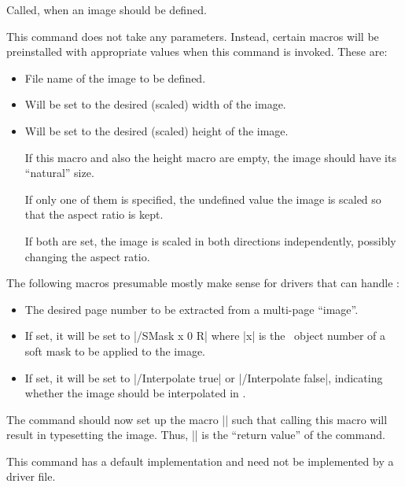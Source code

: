 \begin{command}{\pgfsys@defineimage}
    Called, when an image should be defined.

    This command does not take any parameters. Instead, certain macros will be
    preinstalled with appropriate values when this command is invoked. These
    are:
    \begin{itemize}
        \item\declare{|\pgf@filename|} File name of the image to be defined.
        \item\declare{|\pgf@imagewidth|} Will be set to the desired (scaled)
            width of the image.
        \item\declare{|\pgf@imageheight|} Will be set to the desired (scaled)
            height of the image.

            If this macro and also the height macro are empty, the image should
            have its ``natural'' size.

            If only one of them is specified, the undefined value the image is
            scaled so that the aspect ratio is kept.

            If both are set, the image is scaled in both directions
            independently, possibly changing the aspect ratio.
    \end{itemize}

    The following macros presumable mostly make sense for drivers that
    can handle \pdf:
    \begin{itemize}
        \item \declare{|\pgf@imagepage|} The desired page number to be
            extracted from a multi-page ``image''.
        \item\declare{|\pgf@imagemask|} If set, it will be set to
            |/SMask x 0 R| where |x| is the \pdf\ object number of a soft mask
            to be applied to the image.
        \item\declare{|\pgf@imageinterpolate|} If set, it will be set to
            |/Interpolate true| or |/Interpolate false|, indicating whether the
            image should be interpolated in \pdf.
    \end{itemize}

    The command should now set up the macro |\pgf@image| such that calling this
    macro will result in typesetting the image. Thus, |\pgf@image| is the
    ``return value'' of the command.

    This command has a default implementation and need not be implemented by a
    driver file.
\end{command}


